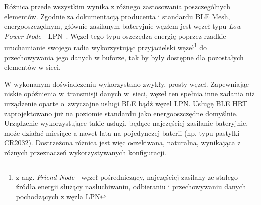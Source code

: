 Różnica przede wszystkim wynika z różnego zastosowania poszczególnych elementów. Zgodnie za dokumentacją producenta i standardu BLE Mesh,
energooszczędnym, głównie zasilanym bateryjnie węzłem jest węzeł typu \textit{Low Power Node} - LPN~\cite{st_an5292_2021}\cite{wooley_martin_bluetooth_2019}. Węzeł tego typu oszczędza energię poprzez rzadkie uruchamianie swojego radia
wykorzystując przyjacielski węzeł\footnote{z ang. \textit{Friend Node} - węzeł pośredniczący, najczęściej zasilany ze stałego 
źródła energii służący nasłuchiwaniu, odbieraniu i przechowywaniu danych pochodzących z węzła LPN} 
do przechowywania jego danych w buforze, tak by były dostępne dla pozostałych elementów w sieci.

W wykonanym doświadczeniu wykorzystano zwykły, prosty węzeł. Zapewniając niskie opóźnienia w~transmisji danych w~sieci, węzeł ten
spełnia inne zadania niż urządzenie oparte o~zwyczajne usługi BLE bądź węzeł LPN. Usługę BLE HRT zaprojektowano już na poziomie standardu
jako energooszczędne domyślnie. Urządzenie wykorzystujące takie usługi, będące najczęściej zasilanie bateryjnie, może działać
miesiące a nawet lata na pojedynczej baterii (np. typu pastylki CR2032). Dostrzeżona różnica jest więc oczekiwana, naturalna, wynikająca
z różnych przeznaczeń wykorzystywanych konfiguracji.
